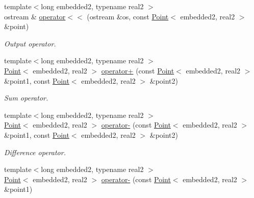 \begin{DoxyCompactItemize}
\item 
\hypertarget{class_point_ac6eecb3c92e49e305452771a073acf4c}{{\footnotesize template$<$long embedded2, typename real2 $>$ }\\ostream \& \hyperlink{class_point_ac6eecb3c92e49e305452771a073acf4c}{operator$<$$<$} (ostream \&os, const \hyperlink{class_point}{\-Point}$<$ embedded2, real2 $>$ \&point)}\label{class_point_ac6eecb3c92e49e305452771a073acf4c}

\begin{DoxyCompactList}\small\item\em \-Output operator. \end{DoxyCompactList}\item 
\hypertarget{class_point_a3ea6134b47e84bd4452443ffde47e70f}{{\footnotesize template$<$long embedded2, typename real2 $>$ }\\\hyperlink{class_point}{\-Point}$<$ embedded2, real2 $>$ \hyperlink{class_point_a3ea6134b47e84bd4452443ffde47e70f}{operator+} (const \hyperlink{class_point}{\-Point}$<$ embedded2, real2 $>$ \&point1, const \hyperlink{class_point}{\-Point}$<$ embedded2, real2 $>$ \&point2)}\label{class_point_a3ea6134b47e84bd4452443ffde47e70f}

\begin{DoxyCompactList}\small\item\em \-Sum operator. \end{DoxyCompactList}\item 
\hypertarget{class_point_ab65b17238ecddcc87348a5e9c55892f3}{{\footnotesize template$<$long embedded2, typename real2 $>$ }\\\hyperlink{class_point}{\-Point}$<$ embedded2, real2 $>$ \hyperlink{class_point_ab65b17238ecddcc87348a5e9c55892f3}{operator-\/} (const \hyperlink{class_point}{\-Point}$<$ embedded2, real2 $>$ \&point1, const \hyperlink{class_point}{\-Point}$<$ embedded2, real2 $>$ \&point2)}\label{class_point_ab65b17238ecddcc87348a5e9c55892f3}

\begin{DoxyCompactList}\small\item\em \-Difference operator. \end{DoxyCompactList}\item 
\hypertarget{class_point_aadb04db36a16719114875b8a267ca639}{{\footnotesize template$<$long embedded2, typename real2 $>$ }\\\hyperlink{class_point}{\-Point}$<$ embedded2, real2 $>$ \hyperlink{class_point_aadb04db36a16719114875b8a267ca639}{operator-\/} (const \hyperlink{class_point}{\-Point}$<$ embedded2, real2 $>$ \&point1)}\label{class_point_aadb04db36a16719114875b8a267ca639}


\end{DoxyCompactItemize}
